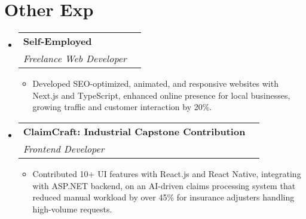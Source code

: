 \documentclass[letterpaper,11pt]{article}
\makeatletter
\newcommand{\resumeItem}[1]{
\item\small{
{#1 \vspace{-2pt}}
}
}
\newcommand{\resumeSubheading}[4]{
\vspace{-2pt}\item
\begin{tabular*}{0.97\textwidth}[t]{l@{\extracolsep{\fill}}r}
\textbf{#1} & #2 \\
\textit{\small#3} & \textit{\small #4} \\
\end{tabular*}\vspace{-7pt}
}
\newcommand{\resumeSubHeadingListStart}{\begin{itemize}[leftmargin=0.15in, label={}]}
\newcommand{\resumeSubHeadingListEnd}{\end{itemize}}
\newcommand{\resumeItemListStart}{\begin{itemize}}
\newcommand{\resumeItemListEnd}{\end{itemize}\vspace{-5pt}}
\makeatother
\begin{document}
\section{Other Exp}
\resumeSubHeadingListStart
\resumeSubheading{Self-Employed}{}{Freelance Web Developer}{}
\resumeItemListStart
\resumeItem{Developed SEO-optimized, animated, and responsive websites with Next.js and TypeScript, enhanced online presence for
local businesses, growing traffic and customer interaction by 20\%.}
\resumeItemListEnd

\resumeSubheading{ClaimCraft: Industrial Capstone Contribution}{}{Frontend Developer}{}
\resumeItemListStart
\resumeItem{Contributed 10+ UI features with React.js and React Native, integrating with ASP.NET backend, on an AI-driven claims
processing system that reduced manual workload by over 45\% for insurance adjusters handling high-volume requests.}
\resumeItemListEnd
\resumeSubHeadingListEnd


\end{document}
